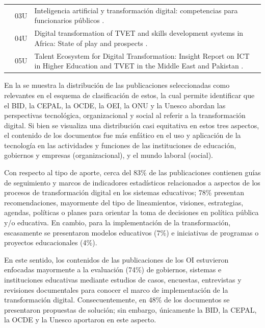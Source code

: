 \begin{table}[htpb]
\begin{threeparttable}
\begin{tabular}{ll >{\raggedright\arraybackslash}p{}}
        & 03U & Inteligencia artificial y transformación digital: competencias
        para funcionarios públicos \cite{balbo}. \\
        & 04U & Digital transformation of TVET and skills development systems in
        Africa: State of play and prospects \cite{unesco2022}. \\
        & 05U & Talent Ecosystem for Digital Transformation: Insight Report on
        ICT in Higher Education and TVET in the Middle East and Pakistan
        \cite{knyazeva2022talent}. \\
      \bottomrule
    \end{tabular}
    \end{threeparttable}
\end{table}

En la se muestra la distribución de las publicaciones
seleccionadas como relevantes en el esquema de clasificación de estos,
la cual permite identificar que el BID, la CEPAL, la OCDE, la OEI, la
ONU y la Unesco abordan las perspectivas tecnológica, organizacional y
social al referir a la transformación digital. Si bien se visualiza una
distribución casi equitativa en estos tres aspectos, el contenido de los
documentos fue más enfático en el uso y aplicación de la tecnología en
las actividades y funciones de las instituciones de educación, gobiernos
y empresas (organizacional), y el mundo laboral (social).

Con respecto al tipo de aporte, cerca del 83\% de las publicaciones
contienen guías de seguimiento y marcos de indicadores estadísticos
relacionados a aspectos de los procesos de transformación digital en los
sistemas educativos; 78\% presentan recomendaciones, mayormente del tipo
de lineamientos, visiones, estrategias, agendas, políticas o planes para
orientar la toma de decisiones en política pública y/o educativa. En
cambio, para la implementación de la transformación, escasamente se
presentaron modelos educativos (7\%) e iniciativas de programas o
proyectos educacionales (4\%).

En este sentido, los contenidos de las publicaciones de los OI
estuvieron enfocadas mayormente a la evaluación (74\%) de gobiernos,
sistemas e instituciones educativas mediante estudios de casos,
encuestas, entrevistas y revisiones documentales para conocer el marco
de implementación de la transformación digital. Consecuentemente, en
48\% de los documentos se presentaron propuestas de solución; sin
embargo, únicamente la BID, la CEPAL, la OCDE y la Unesco aportaron en
este aspecto.

